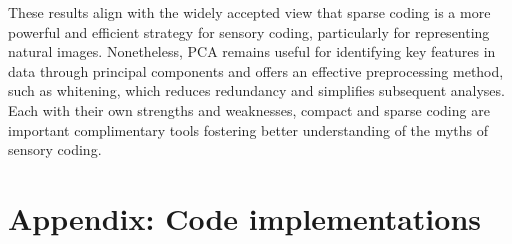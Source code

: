 \documentclass[11pt, twocolumn]{article}
\begin{document}
These results align with the widely accepted view that sparse coding is a more powerful and efficient strategy for sensory coding, particularly for representing natural images. Nonetheless, PCA remains useful for identifying key features in data through principal components and offers an effective preprocessing method, such as whitening, which reduces redundancy and simplifies subsequent analyses. 
Each with their own strengths and weaknesses, compact and sparse coding are important complimentary tools fostering better understanding of the myths of sensory coding.

\begin{small}


\end{small}

\section*{Appendix: Code implementations}
\end{document}

